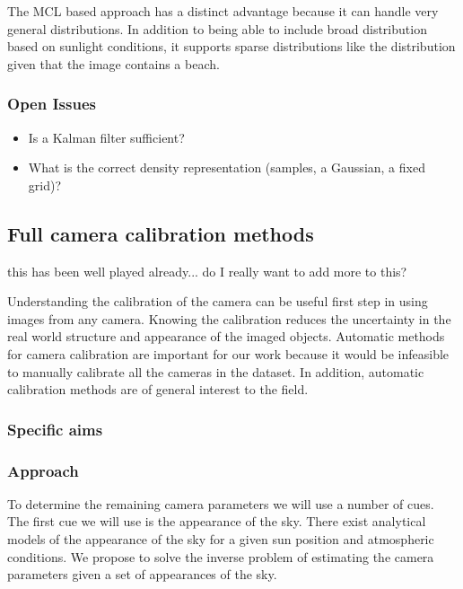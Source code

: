 The MCL based approach has a distinct advantage because it can handle
very general distributions.  In addition to being able to include
broad distribution based on sunlight conditions, it supports sparse
distributions like the distribution given that the image contains a
beach.

\subsubsection{Open Issues}

\begin{itemize}

  \item Is a Kalman filter sufficient?

  \item What is the correct density representation (samples, a
    Gaussian, a fixed grid)?

\end{itemize}


\subsection{Full camera calibration methods}

this has been well played already... do I really want to add
more to this?

Understanding the calibration of the camera can be useful first step
in using images from any camera.  Knowing the calibration reduces the
uncertainty in the real world structure and appearance of the imaged
objects.   Automatic methods for camera calibration are important for
our work because it would be infeasible to manually calibrate all the
cameras in the dataset.  In addition, automatic calibration methods
are of general interest to the field.

\subsubsection{Specific aims}

\subsubsection{Approach}

To determine the remaining camera parameters we will use a number of
cues.  The first cue we will use is the appearance of the sky.  There
exist analytical models of the appearance of the sky for a given sun
position and atmospheric conditions.   We propose to solve the inverse
problem of estimating the camera parameters given a set of appearances
of the sky.

